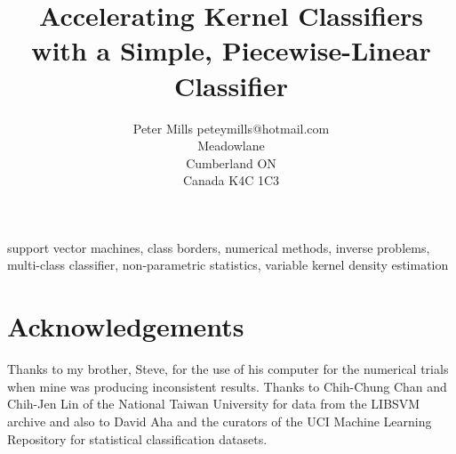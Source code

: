 \documentclass[twoside,11pt]{article}
\begin{document}
\title{Accelerating Kernel Classifiers with a Simple, Piecewise-Linear Classifier}

\author{\name Peter Mills
	\email peteymills@hotmail.com \\
        Meadowlane\\
       Cumberland ON\\
       Canada K4C 1C3}


\maketitle

\begin{abstract}%
	
\end{abstract}

\begin{keywords}
support vector machines,
class borders,
numerical methods, 
inverse problems,
multi-class classifier,
non-parametric statistics,
variable kernel density estimation
\end{keywords}



\newpage

\appendix



\section*{Acknowledgements}

Thanks to my brother, Steve, for the use of his computer for the numerical
trials when mine was producing inconsistent results.
Thanks to Chih-Chung Chan and Chih-Jen Lin of the National Taiwan University
for data from the LIBSVM archive and also to David Aha and the curators of
the UCI Machine Learning Repository for statistical classification datasets.

\vskip 0.2in

\end{document}
